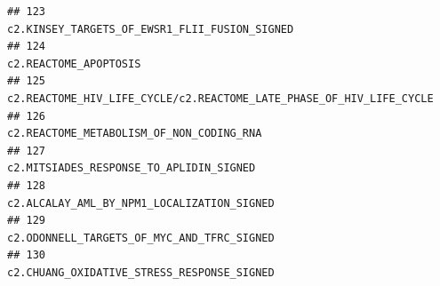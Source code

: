 \documentclass{article}\usepackage[]{graphicx}\usepackage[]{color}
\makeatletter
\newenvironment{kframe}{%
 \def\at@end@of@kframe{}%
 \ifinner\ifhmode%
  \def\at@end@of@kframe{\end{minipage}}%
  \begin{minipage}{\columnwidth}%
 \fi\fi%
 \def\FrameCommand##1{\hskip\@totalleftmargin \hskip-\fboxsep
 \colorbox{shadecolor}{##1}\hskip-\fboxsep
     \hskip-\linewidth \hskip-\@totalleftmargin \hskip\columnwidth}%
 \MakeFramed {\advance\hsize-\width
   \@totalleftmargin\z@ \linewidth\hsize
   \@setminipage}}%
 {\par\unskip\endMakeFramed%
 \at@end@of@kframe}
\newenvironment{knitrout}{}{} %
\makeatother
\begin{document}
\begin{knitrout}
\begin{kframe}
\begin{verbatim}
## 123                                                                                                                                                                                                                                                                                                         c2.KINSEY_TARGETS_OF_EWSR1_FLII_FUSION_SIGNED
## 124                                                                                                                                                                                                                                                                                                                                 c2.REACTOME_APOPTOSIS
## 125                                                                                                                                                                                                                                                                                   c2.REACTOME_HIV_LIFE_CYCLE/c2.REACTOME_LATE_PHASE_OF_HIV_LIFE_CYCLE
## 126                                                                                                                                                                                                                                                                                                              c2.REACTOME_METABOLISM_OF_NON_CODING_RNA
## 127                                                                                                                                                                                                                                                                                                               c2.MITSIADES_RESPONSE_TO_APLIDIN_SIGNED
## 128                                                                                                                                                                                                                                                                                                            c2.ALCALAY_AML_BY_NPM1_LOCALIZATION_SIGNED
## 129                                                                                                                                                                                                                                                                                                            c2.ODONNELL_TARGETS_OF_MYC_AND_TFRC_SIGNED
## 130                                                                                                                                                                                                                                                                                                            c2.CHUANG_OXIDATIVE_STRESS_RESPONSE_SIGNED

\end{verbatim}
\end{kframe}
\end{knitrout}
\end{document}
